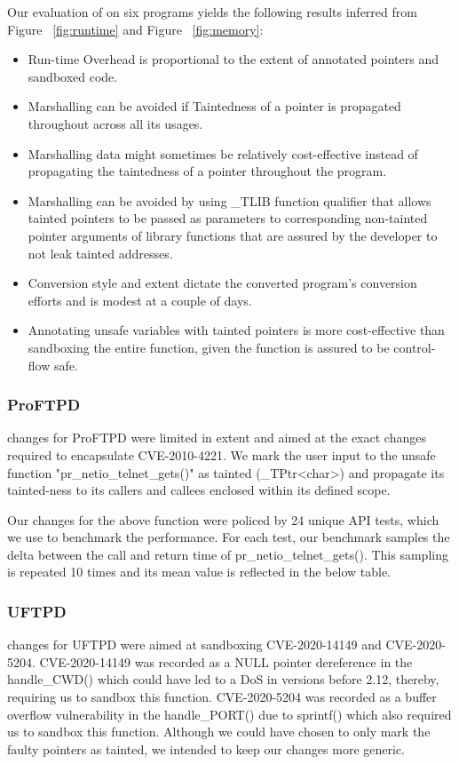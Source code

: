 Our evaluation of \systemname on six programs yields the following results inferred from Figure ~\ref{fig:runtime} and Figure ~\ref{fig:memory}:
\begin{itemize}
  \item Run-time Overhead is proportional to the extent of 
annotated pointers and sandboxed code.
  \item Marshalling can be avoided if Taintedness of a pointer is propagated throughout across all its usages.
  \item Marshalling data might sometimes be relatively cost-effective instead of propagating the taintedness of a pointer throughout the program.
  \item Marshalling can be avoided by using \_TLIB function qualifier that allows tainted pointers to be passed as parameters to corresponding non-tainted pointer arguments of library functions that are assured by the developer to not leak tainted addresses.
  \item Conversion style and extent dictate the converted program's conversion efforts and is modest at a couple of days. 
  \item Annotating unsafe variables with tainted pointers is more cost-effective than sandboxing the entire function, given the function is assured to be control-flow safe.  
\end{itemize}

\subsubsection{\textbf{ProFTPD}}
\systemname changes for ProFTPD were limited in extent and aimed at the exact changes required to encapsulate CVE-2010-4221. We mark the user input to the unsafe function "pr\_netio\_telnet\_gets()" as tainted (\_TPtr<char>) and propagate its tainted-ness to its callers and callees enclosed within its defined scope.

Our changes for the above function were policed by 24 unique API tests, which we use to benchmark the performance. For each test, our benchmark samples the delta between the call and return time of pr\_netio\_telnet\_gets(). This sampling is repeated 10 times and its mean value is reflected in the below table.

\subsubsection{\textbf{UFTPD}}
\systemname changes for UFTPD were aimed at sandboxing CVE-2020-14149 and CVE-2020-5204. CVE-2020-14149 was recorded as a NULL pointer dereference in the handle\_CWD() which could have led to a DoS in versions before 2.12, thereby, requiring us to sandbox this function. CVE-2020-5204 was recorded as a buffer overflow vulnerability in the handle\_PORT() due to sprintf() which also required us to sandbox this function. Although we could have chosen to only mark the faulty pointers as tainted, we intended to keep our changes more generic.

